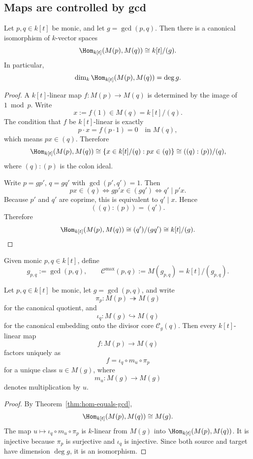 \subsection{Maps are controlled by gcd}

\begin{theorem}[Hom \(=\) gcd]
\ClaimStatusProvedHere
\label{thm:hom-equals-gcd}
Let \(p,q\in k[t]\) be monic, and let \(g=\gcd(p,q)\).
Then there is a canonical isomorphism of \(k\)-vector spaces
\[
\Hom_{k[t]}(M(p),M(q))\cong k[t]/(g).
\]
In particular,
\[
\dim_k\Hom_{k[t]}(M(p),M(q))=\deg g.
\]
\end{theorem}

\begin{proof}
A \(k[t]\)-linear map \(f\colon M(p)\to M(q)\) is determined by the image of \(1\bmod p\).
Write
\[
x:=f(1)\in M(q)=k[t]/(q).
\]
The condition that \(f\) be \(k[t]\)-linear is exactly
\[
p\cdot x = f(p\cdot 1)=0 \quad \text{in } M(q),
\]
which means \(px\in (q)\).
Therefore
\[
\Hom_{k[t]}(M(p),M(q))
\cong \{x \in k[t]/(q): px\in (q)\}
\cong ((q):(p))/(q),
\]
where \((q):(p)\) is the colon ideal.

Write \(p=gp'\), \(q=gq'\) with \(\gcd(p',q')=1\).
Then
\[
px\in (q)
\iff gp'x\in (gq')
\iff q' \mid p'x.
\]
Because \(p'\) and \(q'\) are coprime, this is equivalent to \(q'\mid x\).
Hence
\[
((q):(p)) = (q').
\]
Therefore
\[
\Hom_{k[t]}(M(p),M(q))
\cong (q')/(gq')
\cong k[t]/(g).
\]
\end{proof}

\begin{definition}
Given monic \(p,q\in k[t]\), define
\[
g_{p,q}:=\gcd(p,q),
\qquad
\mathcal C^{\max}(p,q):=M(g_{p,q})=k[t]/(g_{p,q}).
\]
\end{definition}

\begin{theorem}
\ClaimStatusProvedHere
\label{thm:factorization-through-common-core}
Let \(p,q\in k[t]\) be monic, let \(g=\gcd(p,q)\), and write
\[
\pi_p\colon M(p)\twoheadrightarrow M(g)
\]
for the canonical quotient, and
\[
\iota_q\colon M(g)\hookrightarrow M(q)
\]
for the canonical embedding onto the divisor core \(\mathcal C_g(q)\).
Then every \(k[t]\)-linear map
\[
f\colon M(p)\to M(q)
\]
factors uniquely as
\[
f=\iota_q\circ m_u\circ \pi_p
\]
for a unique class \(u\in M(g)\), where
\[
m_u\colon M(g)\to M(g)
\]
denotes multiplication by \(u\).
\end{theorem}

\begin{proof}
By Theorem~\ref{thm:hom-equals-gcd},
\[
\Hom_{k[t]}(M(p),M(q))\cong M(g).
\]
The map \(u\mapsto \iota_q\circ m_u\circ \pi_p\) is \(k\)-linear from \(M(g)\) into \(\Hom_{k[t]}(M(p),M(q))\).
It is injective because \(\pi_p\) is surjective and \(\iota_q\) is injective.
Since both source and target have dimension \(\deg g\), it is an isomorphism.
\end{proof}

